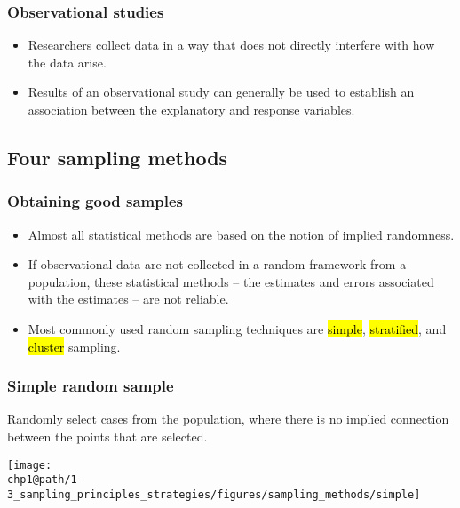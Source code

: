 \documentclass[slidestop,compress,mathserif]{beamer}
\makeatletter
\def\chp1@path{../../Chp 1}
\makeatother
\begin{document}
\begin{frame}
	\frametitle{Observational studies}

	\begin{itemize}
		\item Researchers collect data in a way that does not directly interfere with how the data arise.
		\item Results of an observational study can generally be used to establish an association between the explanatory and response variables.
	\end{itemize}

\end{frame}


\subsection{Four sampling methods}


\begin{frame}
	\frametitle{Obtaining good samples}

	\begin{itemize}
		\item Almost all statistical methods are based on the notion of implied randomness. 
		\item If observational data are not collected in a random framework from a population, these statistical methods -- the estimates and errors associated with the estimates -- are not reliable.
		\item Most commonly used random sampling techniques are \hl{simple}, \hl{stratified}, and \hl{cluster} sampling.
	\end{itemize}

\end{frame}


\begin{frame}
	\frametitle{Simple random sample}

	Randomly select cases from the population, where there is no implied connection between the points that are selected.

	\begin{center}
	\texttt{[image: \\chp1@path/1-3\_sampling\_principles\_strategies/figures/sampling\_methods/simple]}
	\end{center}

\end{frame}
\end{document}

